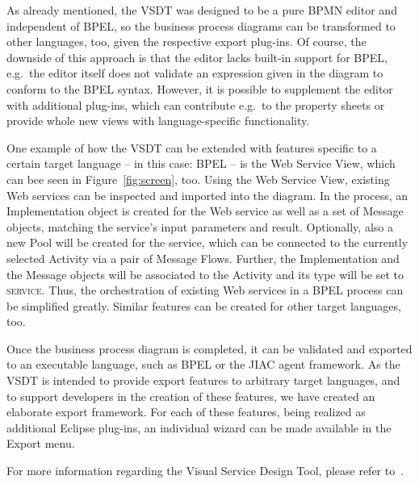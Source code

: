 As already mentioned, the VSDT was designed to be a pure BPMN editor and independent
of BPEL, so the business process diagrams can be transformed to other languages,
too, given the respective export plug-ins.  Of course, the downside of this approach
is that the editor lacks built-in support for BPEL, e.g.\ the editor itself does
not validate an expression given in the diagram to conform to the BPEL syntax.
However, it is possible to supplement the editor with additional plug-ins, which
can contribute e.g.\ to the property sheets or provide whole new views with
language-specific functionality.

One example of how the VSDT can be extended with features specific to a certain
target language -- in this case: BPEL -- is the Web Service View, which can bee
seen in Figure~\ref{fig:screen}, too.  Using the Web Service View, existing Web
services can be inspected and imported into the diagram.  In the process, an
Implementation object is created for the Web service as well as a set of Message
objects, matching the service's input parameters and result.  Optionally, also a
new Pool will be created for the service, which can be connected to the currently
selected Activity via a pair of Message Flows.  Further, the Implementation and
the Message objects will be associated to the Activity and its type will be set
to \textsc{service}.  Thus, the orchestration of existing Web services in a BPEL
process can be simplified greatly.  Similar features can be created for other
target languages, too.

Once the business process diagram is completed, it can be validated and exported
to an executable language, such as BPEL or the JIAC agent framework.  As the VSDT
is intended to provide export features to arbitrary target languages, and to
support developers in the creation of these features, we have created an elaborate
export framework.  For each of these features, being realized as additional
Eclipse plug-ins, an individual wizard can be made available in the Export menu.

For more information regarding the Visual Service Design Tool, please refer
to~\cite{kuester2008vsdt}.



